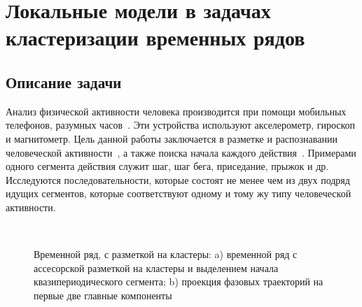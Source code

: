 \newpage


\section{Локальные модели в задачах кластеризации временных рядов}
\subsection{Описание задачи}
Анализ физической активности человека производится при помощи мобильных телефонов, разумных часов~\cite{kwapisz2010, wang2014}. 
Эти устройства используют акселерометр, гироскоп и магнитометр. 
Цель данной работы заключается в  разметке и распознавании человеческой активности~\cite{Ignatov2015, Olivares2012, cinar2018}, а также поиска начала каждого действия~\cite{motrenko2015}. 
Примерами одного сегмента действия служит шаг, шаг бега, приседание, прыжок и др. 
Исследуются последовательности, которые состоят не менее чем из двух подряд идущих сегментов, которые соответствуют одному и тому жу типу человеческой активности.

\begin{figure}[h!t]\center
{}
\\
\caption{Временной ряд, с разметкой на кластеры: a) временной ряд с ассесорской разметкой на кластеры и выделением начала квазипериодического сегмента; b) проекция фазовых траекторий на первые две главные компоненты }
\end{figure}

